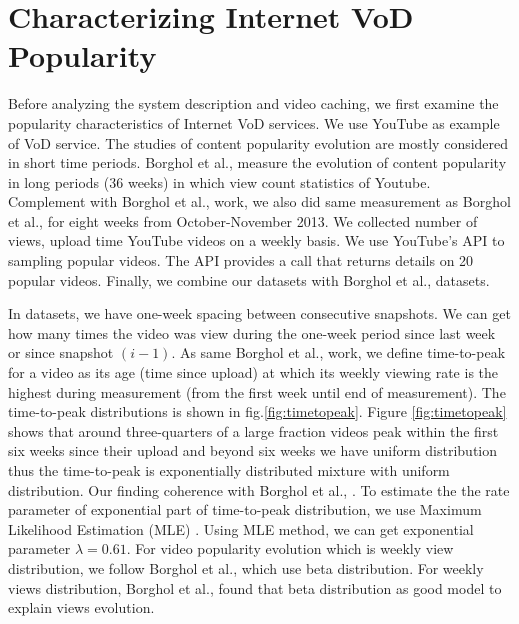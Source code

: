 \documentclass[conference]{IEEEtran}
\begin{document}
\section{Characterizing Internet VoD Popularity}\label{popularity}
Before analyzing the system description and video caching, we first examine the popularity characteristics of Internet VoD services.
We use YouTube as example of VoD service.
The studies of content popularity evolution are mostly considered in short time periods.
Borghol et al., \cite{Borghol:2011:CMP:2039452.2039717} measure the evolution of content popularity in long periods (36 weeks) in which view count statistics of Youtube. 
Complement with Borghol et al., \cite{Borghol:2011:CMP:2039452.2039717} work, we also did same measurement as Borghol et al., \cite{Borghol:2011:CMP:2039452.2039717} for eight weeks from October-November 2013.
We collected number of views, upload time YouTube videos on a weekly basis.
We use YouTube's API to sampling popular videos. 
The API provides a call that returns details on 20 popular videos.
Finally, we combine our datasets with Borghol et al., datasets. 

In datasets, we have one-week spacing between consecutive snapshots.  
We can get how many times the video was view during the one-week period since last week or since snapshot $(i-1)$. 
As same Borghol et al., \cite{Borghol:2011:CMP:2039452.2039717} work, we define time-to-peak for a video as its age (time since upload) at which its weekly viewing rate is the highest during measurement (from the first week until end of measurement).
The time-to-peak distributions is shown in fig.\ref{fig:timetopeak}.
Figure \ref{fig:timetopeak} shows that around three-quarters of a large fraction videos peak within the first six weeks since their upload and beyond six weeks we have uniform distribution thus the time-to-peak is exponentially distributed mixture with uniform distribution. 
Our finding coherence with Borghol et al., \cite{Borghol:2011:CMP:2039452.2039717}.
To estimate the the rate parameter of exponential part of time-to-peak distribution, we use Maximum Likelihood Estimation (MLE) \cite{clauset2009power}.
Using MLE method, we can get exponential parameter $\lambda = 0.61$. 
For video popularity evolution which is weekly view distribution, we follow Borghol et al., \cite{Borghol:2011:CMP:2039452.2039717} which use beta distribution. 
For weekly views distribution, Borghol et al., \cite{Borghol:2011:CMP:2039452.2039717} found that beta distribution as good model to explain views evolution. 
\end{document}
